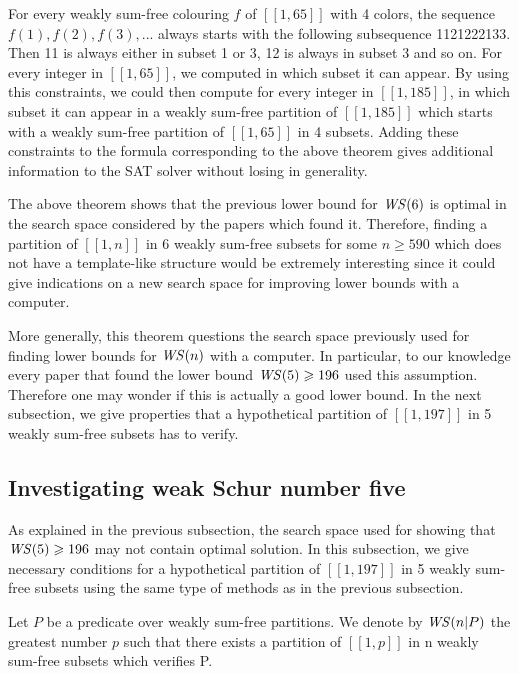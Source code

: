 \par
For every weakly sum-free colouring \(f\) of \([\![1,65]\!]\) with 4 colors, the sequence \(f(1), f(2), f(3), ...\) always
starts with the following subsequence 1121222133. Then 11 is always
either in subset 1 or 3, 12 is always in subset 3 and so on. For every integer in \([\![1,65]\!]\), we computed in which
subset it can appear.
By using this constraints, we could then compute for every integer in \([\![1,185]\!]\), in which subset it can appear
in a weakly sum-free
partition of \([\![1,185]\!]\) which starts with a weakly sum-free partition of \([\![1,65]\!]\) in 4 subsets. Adding
these constraints to the
formula corresponding to the above theorem gives additional information to the SAT solver without losing in generality.

\par
The above theorem shows that the previous lower bound for \(\mathit{WS} (6)\) is optimal in the search space considered by the
papers which found it.
Therefore, finding a partition of \([\![1,n]\!]\) in 6 weakly sum-free subsets for some \(n \geqslant 590\) which does
not have a template-like structure
would be extremely interesting since it could give indications on a new search space for improving lower bounds with a
computer. 

\par More generally, this theorem questions the search space previously used for finding lower bounds for \(\mathit{WS} (n)\) 
with a computer. In particular, to our knowledge every paper that found the lower bound \(\mathit{WS} (5) \geqslant 196\) 
used this assumption. Therefore one may wonder if this is actually a good lower bound. In the next subsection, we give 
properties that a hypothetical partition of \([\![1,197]\!]\) in 5 weakly sum-free subsets has to verify.


\subsection{Investigating weak Schur number five}

\qquad As explained in the previous subsection, the search space used for showing that \(\mathit{WS} (5) \geqslant 196\) may not contain
optimal solution. In this subsection,
we give necessary conditions for a hypothetical partition of \([\![1,197]\!]\) in 5 weakly sum-free subsets using the
same type of methods as in the
previous subsection.

\begin{notation}
Let \(P\) be a predicate over weakly sum-free partitions. We denote by \(\mathit{WS} (n | P)\) the greatest number \(p\) such that
there exists a partition of
\([\![1,p]\!]\) in n weakly sum-free subsets which verifies P.
\end{notation}

